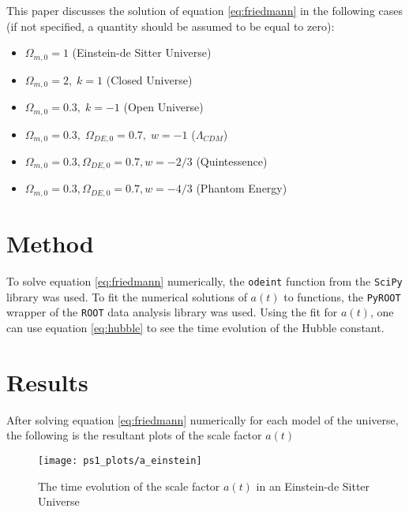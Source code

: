 \documentclass[aps,reprint,prl]{revtex4-1}
\begin{document}
This paper discusses the solution of equation \ref{eq:friedmann} in the following cases (if not specified, a quantity should be assumed to be equal to zero):
\begin{itemize}
\item $\Omega_{m,0}=1$ (Einstein-de Sitter Universe)
\item $\Omega_{m,0}=2,\;k=1$ (Closed Universe)
\item $\Omega_{m,0}=0.3,\;k=-1$ (Open Universe)
\item $\Omega_{m,0}=0.3,\;\Omega_{DE,0}=0.7,\;w=-1$ ($\Lambda_{CDM}$)
\item $\Omega_{m,0}=0.3,\Omega_{DE,0}=0.7,w=-2/3$ (Quintessence)
\item $\Omega_{m,0}=0.3,\Omega_{DE,0}=0.7,w=-4/3$ (Phantom Energy)
\end{itemize}
\section*{Method}
To solve equation \ref{eq:friedmann} numerically, the \texttt{odeint} function from the \texttt{SciPy} library \cite{scipy} was used.  To fit the numerical solutions of $a(t)$ to functions, the \texttt{PyROOT} wrapper of the \texttt{ROOT} data analysis library \cite{ROOT} was used.  Using the fit for $a(t)$, one can use equation \ref{eq:hubble} to see the time evolution of the Hubble constant.
\section*{Results}
After solving equation \ref{eq:friedmann} numerically for each model of the universe, the following is the resultant plots of the scale factor $a(t)$

\begin{figure}[H!]
\texttt{[image: ps1\_plots/a\_einstein]}
\caption{The time evolution of the scale factor $a(t)$ in an Einstein-de Sitter Universe}
\end{figure}
\end{document}
